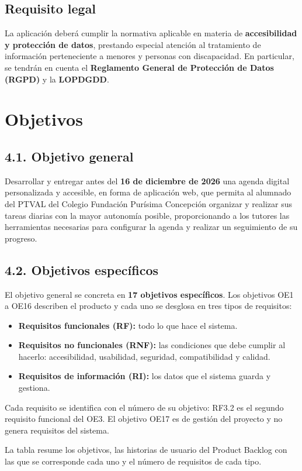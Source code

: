 \documentclass[11pt,a4paper]{article}
\newcommand{\hl}[1]{\textcolor{gblue}{\textbf{#1}}}
\begin{document}
\subsection*{Requisito legal}
La aplicación deberá cumplir la normativa aplicable en materia de \hl{accesibilidad y protección de datos}, prestando especial atención al tratamiento de información perteneciente a menores y personas con discapacidad. En particular, se tendrán en cuenta el \hl{Reglamento General de Protección de Datos (RGPD)} y la \hl{LOPDGDD}.

\section{Objetivos}
\subsection*{4.1. Objetivo general}
Desarrollar y entregar antes del \hl{16 de diciembre de 2026} una agenda digital personalizada y accesible, en forma de aplicación web, que permita al alumnado del PTVAL del Colegio Fundación Purísima Concepción organizar y realizar sus tareas diarias con la mayor autonomía posible, proporcionando a los tutores las herramientas necesarias para configurar la agenda y realizar un seguimiento de su progreso.

\subsection*{4.2. Objetivos específicos}
El objetivo general se concreta en \hl{17 objetivos específicos}. Los objetivos OE1 a OE16 describen el producto y cada uno se desglosa en tres tipos de requisitos:

\begin{itemize}
\item \hl{Requisitos funcionales (RF):} todo lo que hace el sistema.
\item \hl{Requisitos no funcionales (RNF):} las condiciones que debe cumplir al hacerlo: accesibilidad, usabilidad, seguridad, compatibilidad y calidad.
\item \hl{Requisitos de información (RI):} los datos que el sistema guarda y gestiona.
\end{itemize}
Cada requisito se identifica con el número de su objetivo: RF3.2 es el segundo requisito funcional del OE3. El objetivo OE17 es de gestión del proyecto y no genera requisitos del sistema.

La tabla resume los objetivos, las historias de usuario del Product Backlog con las que se corresponde cada uno y el número de requisitos de cada tipo.
\end{document}

